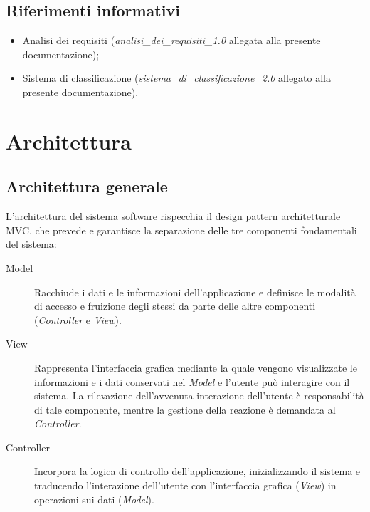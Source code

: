 \documentclass[10pt,a4paper,headinclude,footinclude,hidelinks]{scrreprt} %
\begin{document}

	\section{Riferimenti informativi}
	\begin{itemize}
	\item Analisi dei requisiti (\textit{analisi\_dei\_requisiti\_1.0} allegata alla presente documentazione);
	\item Sistema di classificazione (\textit{sistema\_di\_classificazione\_2.0} allegato alla presente documentazione).
	\end{itemize}

	\chapter{Architettura}
	\label{ch:stage:design:architettura}

	\section{Architettura generale}
	\label{sec:stage:design:architettura:mvc}
	L'architettura del sistema software rispecchia il design pattern architetturale MVC, che prevede e garantisce la separazione delle tre componenti fondamentali del sistema:
	\begin{description}
	\item[Model] Racchiude i dati e le informazioni dell'applicazione e definisce le modalità di accesso e fruizione degli stessi da parte delle altre componenti (\textit{Controller} e \textit{View}).
 	\item[View] Rappresenta l'interfaccia grafica mediante la quale vengono visualizzate le informazioni e i dati conservati nel \textit{Model} e l'utente può interagire con il sistema. La rilevazione dell'avvenuta interazione dell'utente è responsabilità di tale componente, mentre la gestione della reazione è demandata al \textit{Controller}.
	\item[Controller] Incorpora la logica di controllo dell'applicazione, inizializzando il sistema e traducendo l'interazione dell'utente con l'interfaccia grafica (\textit{View}) in operazioni sui dati (\textit{Model}).
	\end{description}
\end{document}
